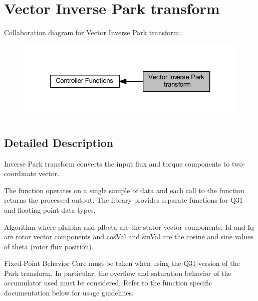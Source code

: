 \hypertarget{group__inv__park}{}\section{Vector Inverse Park transform}
\label{group__inv__park}
Collaboration diagram for Vector Inverse Park transform\+:
\nopagebreak
\begin{figure}[H]
\begin{center}
\leavevmode
\includegraphics[width=321pt]{group__inv__park}
\end{center}
\end{figure}


\subsection{Detailed Description}
Inverse Park transform converts the input flux and torque components to two-\/coordinate vector.

The function operates on a single sample of data and each call to the function returns the processed output. The library provides separate functions for Q31 and floating-\/point data types. \begin{DoxyParagraph}{Algorithm}
 where {\ttfamily p\+Ialpha} and {\ttfamily p\+Ibeta} are the stator vector components, {\ttfamily Id} and {\ttfamily Iq} are rotor vector components and {\ttfamily cos\+Val} and {\ttfamily sin\+Val} are the cosine and sine values of theta (rotor flux position). 
\end{DoxyParagraph}
\begin{DoxyParagraph}{Fixed-\/\+Point Behavior}
Care must be taken when using the Q31 version of the Park transform. In particular, the overflow and saturation behavior of the accumulator used must be considered. Refer to the function specific documentation below for usage guidelines. 
\end{DoxyParagraph}

